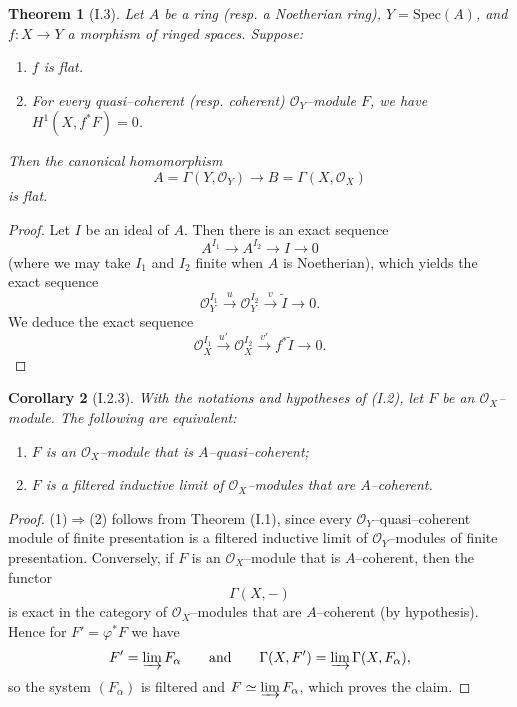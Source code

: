\documentclass[a4paper]{amsart}
\newtheorem{theorem}{Theorem}[section]
\newtheorem{cor}[theorem]{Corollary}
\theoremstyle{definition}
\theoremstyle{definition}
\begin{document}
\begin{theorem}[I.3]
Let $A$ be a ring (resp. a Noetherian ring), $Y = \mathrm{Spec}(A)$, and $f \colon X \to Y$ a morphism of ringed spaces. Suppose:
\begin{enumerate}
\item $f$ is flat.
\item For every quasi–coherent (resp. coherent) $\mathcal{O}_Y$–module $F$, we have $H^1(X, f^* F) = 0$.
\end{enumerate}
Then the canonical homomorphism
\[
A = \Gamma(Y, \mathcal{O}_Y) \longrightarrow B = \Gamma(X, \mathcal{O}_X)
\]
is flat.
\end{theorem}

\begin{proof}
Let $I$ be an ideal of $A$. Then there is an exact sequence
\[
A^{I_1} \to A^{I_2} \to I \to 0
\]
(where we may take $I_1$ and $I_2$ finite when $A$ is Noetherian), which yields the exact sequence
\[
\mathcal{O}_Y^{I_1} \xrightarrow{u} \mathcal{O}_Y^{I_2} \xrightarrow{v} \tilde{I} \to 0.
\]
We deduce the exact sequence
\[
\mathcal{O}_X^{I_1} \xrightarrow{u'} \mathcal{O}_X^{I_2} \xrightarrow{v'} f^* \tilde{I} \to 0.
\]
\end{proof}


\begin{cor}[I.2.3]
With the notations and hypotheses of (I.2), let $F$ be an $\mathcal O_X$–module.
The following are equivalent:
\begin{enumerate}
\item $F$ is an $\mathcal O_X$–module that is $A$–quasi–coherent;
\item $F$ is a filtered inductive limit of $\mathcal O_X$–modules that are $A$–coherent.
\end{enumerate}
\end{cor}

\begin{proof}
(1)$\Rightarrow$(2) follows from Theorem (I.1), since every $\mathcal O_Y$–quasi–coherent module of finite presentation is a filtered inductive limit of $\mathcal O_Y$–modules of finite presentation.  
Conversely, if $F$ is an $\mathcal O_X$–module that is $A$–coherent, then the functor
\[
\Gamma(X, -)
\]
is exact in the category of $\mathcal O_X$–modules that are $A$–coherent (by hypothesis). Hence for $F' = \varphi^*F$ we have
\[
F' = \varinjlim F_\alpha \qquad\text{and}\qquad \Gamma(X, F')=\varinjlim \Gamma(X,F_\alpha),
\]
so the system $(F_\alpha)$ is filtered and $F \simeq \varinjlim F_\alpha$, which proves the claim.
\end{proof}
\end{document}
